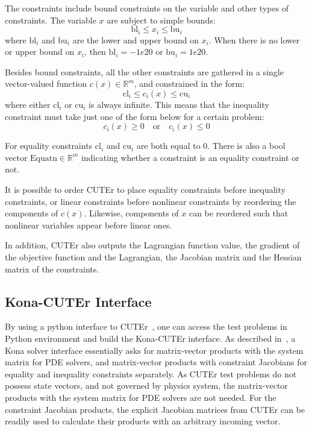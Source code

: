 The constraints include bound constraints on the variable and other types of constraints. The variable $x$ are subject to simple bounds:
\begin{equation*}
\text{bl}_i \leq x_i \leq \text{bu}_i  
\end{equation*}
where $\text{bl}_i$ and $\text{bu}_i$ are the lower and upper bound on $x_i$. When there is no lower or upper bound on $x_i$, then $\text{bl}_i = -1e20$ or $\text{bu}_i = 1e20$. 

Besides bound constraints, all the other constraints are gathered in a single vector-valued function $c(x) \in \mathbb{R}^m$, and constrained in the form:    
\begin{equation*}
\text{cl}_i \leq c_i(x) \leq \text{cu}_i  
\end{equation*}
where either $\text{cl}_i$ or $\text{cu}_i$ is always infinite. This means that the inequality constraint must take just one of the form below for a certain problem:
\begin{equation*}
c_i(x) \geq 0   \quad  \text{or}  \quad  c_i(x) \leq 0
\end{equation*}

For equality constraints $\text{cl}_i$ and $\text{cu}_i$ are both equal to 0. There is also a bool vector $\text{Equatn} \in \mathbb{R}^m$ indicating whether a constraint is an equality constraint or not. 

It is possible to order CUTEr to place equality constraints before inequality constraints, or linear constraints before nonlinear constraints by reordering the components of $c(x)$. Likewise, components of $x$ can be reordered such that nonlinear variables appear before linear ones. 

In addition, CUTEr also outputs the Lagrangian function value, the gradient of the objective function and the Lagrangian, the Jacobian matrix and the Hessian matrix of the constraints. 

\subsection{Kona-CUTEr Interface}
By using a python interface to CUTEr~\cite{cuter_python}, one can access the test problems in Python environment and build the Kona-CUTEr interface. As described in~\cite{dener:scitech2016}, a Kona solver interface essentially asks for matrix-vector products with the system matrix for PDE solvers, and matrix-vector products with constraint Jacobians for equality and inequality constraints separately. As CUTEr test problems do not possess state vectors, and not governed by physics system, the matrix-vector products with the system matrix for PDE solvers are not needed. For the constraint Jacobian products, the explicit Jacobian matrices from CUTEr can be readily used to calculate their products with an arbitrary incoming vector. 

